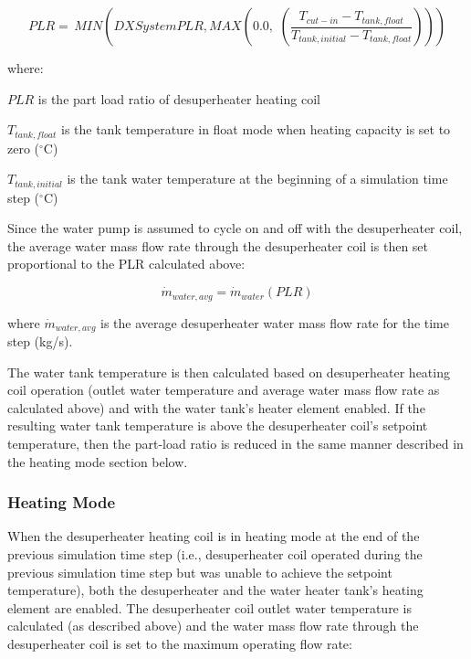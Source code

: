\begin{equation}
PLR = \,MIN\left( {DXSystemPLR,MAX\left( {0.0,\,\,\left( {\frac{{{T_{cut - in}} - {T_{tank,float}}}}{{{T_{tank,initial}} - {T_{tank,float}}}}} \right)} \right)} \right)
\end{equation}

where:

\(PLR\) is the part load ratio of desuperheater heating coil

\({T_{tank,float}}\) is the tank temperature in float mode when heating capacity is set to zero (\(^{\circ}\)C)

\({T_{tank,initial}}\) is the tank water temperature at the beginning of a simulation time step (\(^{\circ}\)C)

Since the water pump is assumed to cycle on and off with the desuperheater coil, the average water mass flow rate through the desuperheater coil is then set proportional to the PLR calculated above:

\begin{equation}
\dot{m}_{water,avg} = \dot{m}_{water}\left( {PLR} \right)
\end{equation}

where \(\dot{m}_{water,avg}\) is the average desuperheater water mass flow rate for the time step (kg/s).

The water tank temperature is then calculated based on desuperheater heating coil operation (outlet water temperature and average water mass flow rate as calculated above) and with the water tank's heater element enabled. If the resulting water tank temperature is above the desuperheater coil's setpoint temperature, then the part-load ratio is reduced in the same manner described in the heating mode section below.

\subsubsection{Heating Mode}\label{heating-mode}

When the desuperheater heating coil is in heating mode at the end of the previous simulation time step (i.e., desuperheater coil operated during the previous simulation time step but was unable to achieve the setpoint temperature), both the desuperheater and the water heater tank's heating element are enabled. The desuperheater coil outlet water temperature is calculated (as described above) and the water mass flow rate through the desuperheater coil is set to the maximum operating flow rate:

